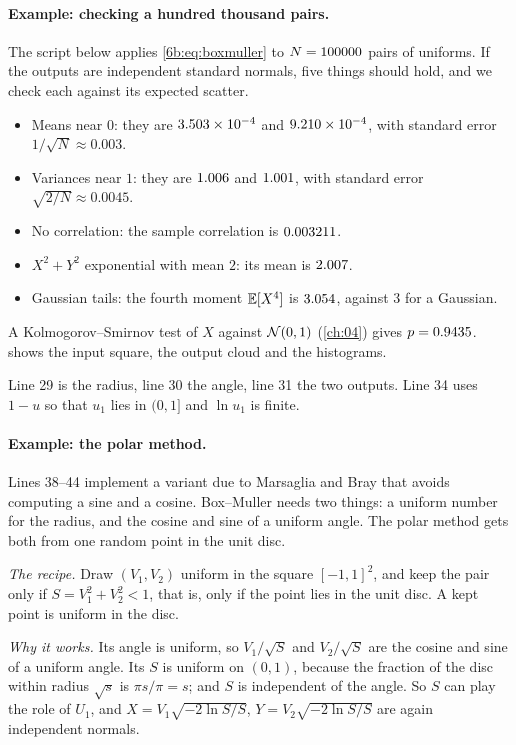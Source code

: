 \paragraph{Example: checking a hundred thousand pairs.}
The script below applies \eqref{6b:eq:boxmuller} to $N=100000$ pairs of uniforms.
If the outputs are independent standard normals, five things should hold, and we
check each against its expected scatter.
\begin{itemize}[itemsep=1pt,leftmargin=1.2em]
  \item Means near $0$: they are $3.503\times10^{-4}$ and $9.210\times10^{-4}$, with standard
        error $1/\sqrt N\approx0.003$.
  \item Variances near $1$: they are $1.006$ and $1.001$, with
        standard error $\sqrt{2/N}\approx0.0045$.
  \item No correlation: the sample correlation is $0.003211$.
  \item $X^2+Y^2$ exponential with mean $2$: its mean is $2.007$.
  \item Gaussian tails: the fourth moment $\E[X^4]$ is $3.054$, against $3$
        for a Gaussian.
\end{itemize}
A Kolmogorov--Smirnov test of $X$ against $\mathcal{N}(0,1)$ (\cref{ch:04}) gives
$p=0.9435$.  shows the input square, the output cloud and
the histograms.


Line 29 is the radius, line 30 the angle, line 31 the two outputs. Line 34 uses
$1-u$ so that $u_1$ lies in $(0,1]$ and $\ln u_1$ is finite.

\paragraph{Example: the polar method.}
Lines 38--44 implement a variant due to Marsaglia and Bray \cite{MarsagliaBray1964}
that avoids computing a sine and a cosine. Box--Muller needs two things: a uniform
number for the radius, and the cosine and sine of a uniform angle. The polar method
gets both from one random point in the unit disc.

\emph{The recipe.} Draw $(V_1,V_2)$ uniform in the square $[-1,1]^2$, and keep the
pair only if $S=V_1^2+V_2^2<1$, that is, only if the point lies in the unit disc.
A kept point is uniform in the disc.

\emph{Why it works.} Its angle is uniform, so $V_1/\sqrt S$ and $V_2/\sqrt S$ are
the cosine and sine of a uniform angle. Its $S$ is uniform on $(0,1)$, because
the fraction of the disc within radius $\sqrt s$ is $\pi s/\pi=s$; and $S$ is
independent of the angle. So $S$ can play the role of $U_1$, and
$X=V_1\sqrt{-2\ln S/S}$, $Y=V_2\sqrt{-2\ln S/S}$ are again independent normals.

